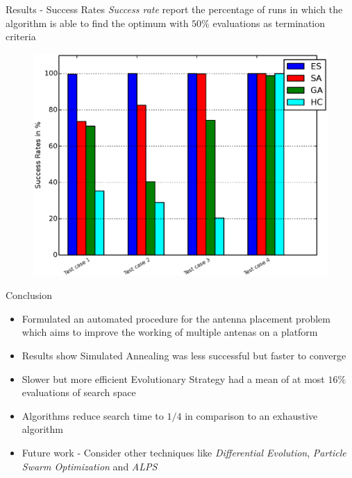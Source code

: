 \documentclass{beamer}
\begin{document}
\begin{frame}{Results - Success Rates}
    \textit{Success rate} report the percentage of runs in which the algorithm is able to find the optimum with $50\%$ evaluations as termination criteria
    \begin{figure}
        \vspace*{-0.35cm}
        \centering
        \includegraphics[scale=0.4]{../paper/FIG/tc_sp}
    \end{figure}
\end{frame}

\begin{frame}{Conclusion}
\begin{itemize} \itemsep1.2em
        \item Formulated an automated procedure for the antenna placement problem which aims to improve the working of multiple antenas on a platform
        \item Results show Simulated Annealing was less successful but faster to converge 
        \item Slower but more efficient Evolutionary Strategy had a mean of at most $16\%$ evaluations of search space 
        \item Algorithms reduce search time to $1/4$ in comparison to an exhaustive algorithm
        \item Future work - Consider other techniques like \textit{Differential Evolution}, \textit{Particle Swarm Optimization} and \textit{ALPS}
    \end{itemize}
\end{frame}
\end{document}

